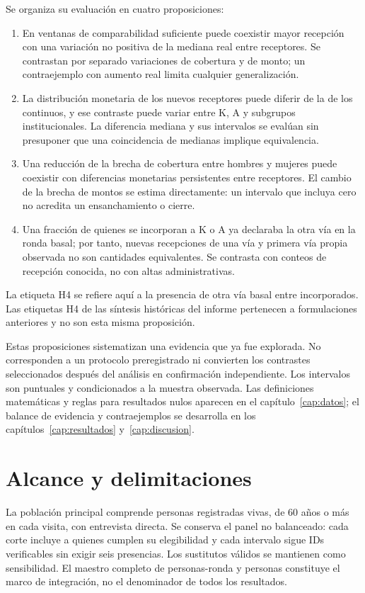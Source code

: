 Se organiza su evaluación en cuatro proposiciones:

\begin{enumerate}
\item[\textbf{H1.}] En ventanas de comparabilidad suficiente puede coexistir
mayor recepción con una variación no positiva de la mediana real entre
receptores. Se contrastan por separado variaciones de cobertura y de monto;
un contraejemplo con aumento real limita cualquier generalización.
\item[\textbf{H2.}] La distribución monetaria de los nuevos receptores puede
diferir de la de los continuos, y ese contraste puede variar entre K, A y
subgrupos institucionales. La diferencia mediana y sus intervalos se evalúan
sin presuponer que una coincidencia de medianas implique equivalencia.
\item[\textbf{H3.}] Una reducción de la brecha de cobertura entre hombres y
mujeres puede coexistir con diferencias monetarias persistentes entre
receptores. El cambio de la brecha de montos se estima directamente:
un intervalo que incluya cero no acredita un ensanchamiento o cierre.
\item[\textbf{H4.}] Una fracción de quienes se incorporan a K o A ya
declaraba la otra vía en la ronda basal; por tanto, nuevas recepciones de
una vía y primera vía propia observada no son cantidades equivalentes.
Se contrasta con conteos de recepción conocida, no con altas administrativas.
\end{enumerate}

La etiqueta H4 se refiere aquí a la presencia de otra vía basal entre
incorporados. Las etiquetas H4 de las síntesis históricas del informe
pertenecen a formulaciones anteriores y no son esta misma proposición.

Estas proposiciones sistematizan una evidencia que ya fue explorada. No
corresponden a un protocolo preregistrado ni convierten los contrastes
seleccionados después del análisis en confirmación independiente. Los
intervalos son puntuales y condicionados a la muestra observada.
Las definiciones matemáticas y reglas para resultados nulos aparecen en el
capítulo~\ref{cap:datos}; el balance de evidencia y contraejemplos se desarrolla
en los capítulos~\ref{cap:resultados} y~\ref{cap:discusion}.

\section{Alcance y delimitaciones}

La población principal comprende personas registradas vivas, de 60 años o más
en cada visita, con entrevista directa. Se conserva el panel no balanceado:
cada corte incluye a quienes cumplen su elegibilidad y cada intervalo sigue
IDs verificables sin exigir seis presencias. Los sustitutos válidos se
mantienen como sensibilidad. El maestro completo de \cpTotalRegistros{}
personas-ronda y \cpTotalPersonas{} personas constituye el marco de integración,
no el denominador de todos los resultados.

